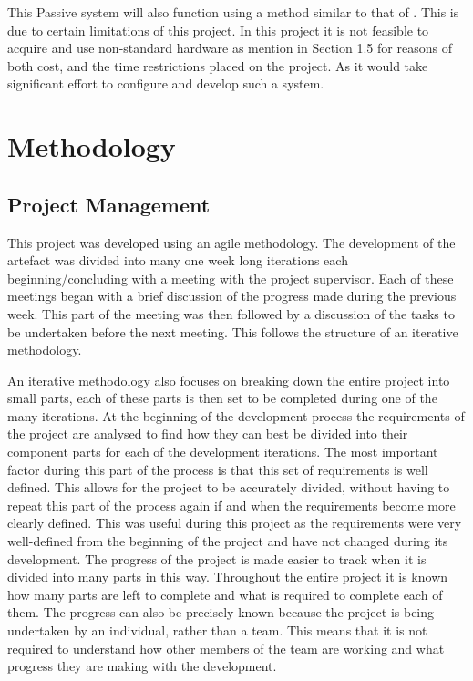 \documentclass[11pt,a4paper]{report}
\begin{document}
This Passive system will also function using a method similar to that of \cite{rougier2007fall}. This is due to certain limitations of this project. In this project it is not feasible to acquire and use non-standard hardware as mention in Section 1.5 for reasons of both cost, and the time restrictions placed on the project. As it would take significant effort to configure and develop such a system.

\chapter{Methodology}

\section{Project Management}
This project was developed using an agile methodology. The development of the artefact was divided into many one week long iterations each beginning/concluding with a meeting with the project supervisor. Each of these meetings began with a brief discussion of the progress made during the previous week. This part of the meeting was then followed by a discussion of the tasks to be undertaken before the next meeting. This follows the structure of an iterative methodology.

An iterative methodology also focuses on breaking down the entire project into small parts, each of these parts is then set to be completed during one of the many iterations. At the beginning of the development process the requirements of the project are analysed to find how they can best be divided into their component parts for each of the development iterations. The most important factor during this part of the process is that this set of requirements is well defined. This allows for the project to be accurately divided, without having to repeat this part of the process again if and when the requirements become more clearly defined. This was useful during this project as the requirements were very well-defined from the beginning of the project and have not changed during its development. The progress of the project is made easier to track when it is divided into many parts in this way. Throughout the entire project it is known how many parts are left to complete and what is required to complete each of them. The progress can also be precisely known because the project is being undertaken by an individual, rather than a team. This means that it is not required to understand how other members of the team are working and what progress they are making with the development.
\end{document}
